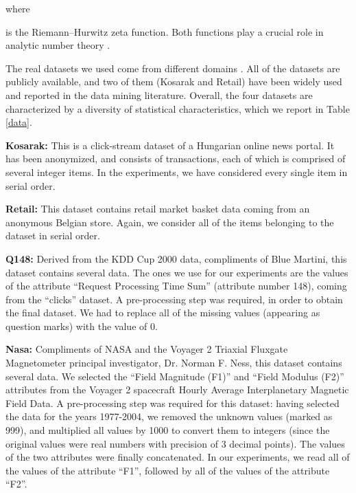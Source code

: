 \documentclass[final,3p,times]{elsarticle}
\begin{document}
\noindent where



\noindent is the Riemann--Hurwitz zeta function. Both functions play a crucial role in analytic number theory \cite{iwaniec-kowalski} \cite{Tempesta}. 

The real datasets we used come from different domains \cite{Dallachiesa}. All of the datasets are publicly available, and two of them (Kosarak and Retail) have been widely used and reported in the data mining literature. Overall, the four datasets are characterized by a diversity of statistical characteristics, which we report in Table \ref{data}. 

\textbf{Kosarak:} This is a click-stream dataset of a Hungarian online news portal. It has been anonymized, and consists of transactions, each of which is comprised of several integer items. In the experiments, we have considered every single item in serial order.

\textbf{Retail:} This dataset contains retail market basket data coming from an anonymous Belgian store. Again, we consider all of the items belonging to the dataset in serial order.

\textbf{Q148:} Derived from the KDD Cup 2000 data, compliments of Blue Martini, this dataset contains several data. The ones we use for our experiments are the values of the attribute “Request Processing Time Sum” (attribute number 148), coming from the ``clicks'' dataset. A pre-processing step was required, in order to obtain the final dataset. We had to replace all of the missing values (appearing as question marks) with the value of 0.

\textbf{Nasa:} Compliments of NASA and the Voyager 2 Triaxial Fluxgate Magnetometer principal investigator, Dr. Norman F. Ness, this dataset contains several data. We selected the “Field Magnitude (F1)” and “Field Modulus (F2)” attributes from the Voyager 2 spacecraft Hourly Average Interplanetary Magnetic Field Data. A pre-processing step was required for this dataset: having selected the data for the years 1977-2004, we removed the unknown values (marked as 999), and multiplied all values by 1000 to convert them to integers (since the original values were real numbers with precision of 3 decimal points). The values of the two attributes were finally concatenated. In our experiments, we read all of the values of the attribute “F1”, followed by all of the values of the attribute “F2”.
\end{document}
